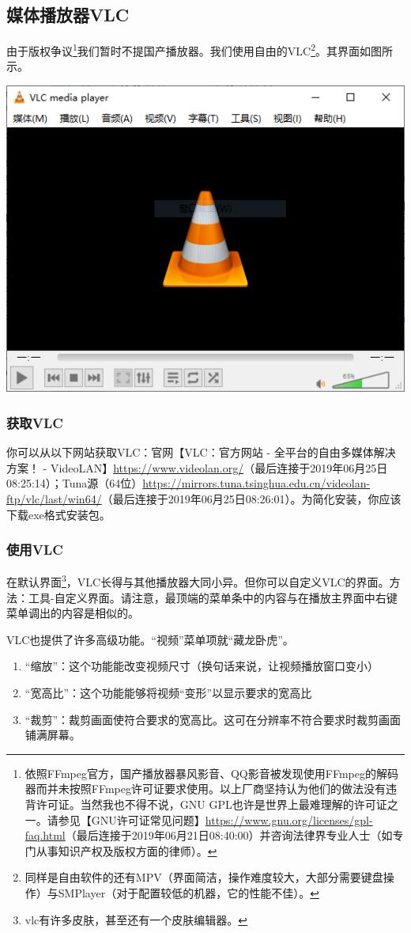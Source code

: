 \subsection{媒体播放器VLC}
由于版权争议\footnote{依照FFmpeg官方，国产播放器暴风影音、QQ影音被发现使用FFmpeg的解码器而并未按照FFmpeg许可证要求使用。以上厂商坚持认为他们的做法没有违背许可证。当然我也不得不说，GNU GPL也许是世界上最难理解的许可证之一。请参见【GNU许可证常见问题】\url{https://www.gnu.org/licenses/gpl-faq.html}（最后连接于2019年06月21日08:40:00）并咨询法律界专业人士（如专门从事知识产权及版权方面的律师）。}我们暂时不提国产播放器。我们使用自由的VLC\footnote{同样是自由软件的还有MPV（界面简洁，操作难度较大，大部分需要键盘操作）与SMPlayer（对于配置较低的机器，它的性能不佳）。}。其界面如图所示。
\begin{center}
\includegraphics[scale=0.9]{pic/vlc.png}	
\end{center} \par
\subsubsection{获取VLC}
你可以从以下网站获取VLC：官网【VLC：官方网站 - 全平台的自由多媒体解决方案！ - VideoLAN】\url{https://www.videolan.org/}（最后连接于2019年06月25日08:25:14）；Tuna源（64位）\url{https://mirrors.tuna.tsinghua.edu.cn/videolan-ftp/vlc/last/win64/}（最后连接于2019年06月25日08:26:01）。为简化安装，你应该下载exe格式安装包。
\subsubsection{使用VLC}
在默认界面\footnote{vlc有许多皮肤，甚至还有一个皮肤编辑器。}，VLC长得与其他播放器大同小异。但你可以自定义VLC的界面。方法：工具-自定义界面。请注意，最顶端的菜单条中的内容与在播放主界面中右键菜单调出的内容是相似的。\par
VLC也提供了许多高级功能。“视频”菜单项就“藏龙卧虎”。
\begin{enumerate}
	\item “缩放”：这个功能能改变视频尺寸（换句话来说，让视频播放窗口变小）
	\item “宽高比”：这个功能能够将视频“变形”以显示要求的宽高比
	\item “裁剪”：裁剪画面使符合要求的宽高比。这可在分辨率不符合要求时裁剪画面铺满屏幕。
\end{enumerate}
